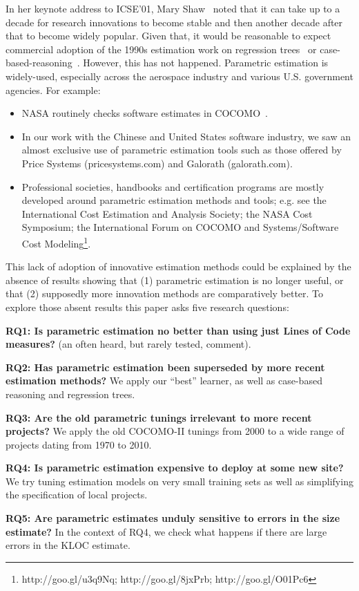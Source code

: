 \documentclass{sig-alternate}
\newcommand{\bi}{\begin{itemize}[leftmargin=0.4cm]}
\newcommand{\ei}{\end{itemize}}
\begin{document}
In her keynote address to ICSE'01, Mary Shaw~\cite{shaw01} noted that it can take up to a
decade  for  research innovations
to become stable and then another decade after that to become widely popular. Given that, it would be reasonable
to expect commercial adoption of  the 1990s estimation work
on  regression trees~\cite{shepperd97} or case-based-reasoning~\cite{shepperd97}. However, 
this has not happened.
Parametric estimation is
widely-used, especially across the aerospace
industry and various U.S. government agencies. For example:
\bi 
\item 
NASA routinely checks  software estimates 
in  COCOMO~\cite{dabney07}.  
\item
In our work with the Chinese and United States software industry,
we saw an   almost exclusive
use  of parametric estimation tools such as those offered by 
Price Systems (pricesystems.com) and  Galorath (galorath.com).
\item 
Professional societies, handbooks and
certification programs are mostly developed around 
parametric estimation methods and tools; e.g. see the 
International Cost Estimation and Analysis Society; the
NASA Cost Symposium;  the
International Forum on COCOMO and Systems/Software
Cost Modeling\footnote{http://goo.gl/u3q9Nq; http://goo.gl/8jxPrb; http://goo.gl/O01Pc6}.
\ei
This  lack of adoption of   innovative  estimation methods
could be explained by the absence of results showing that
(1) parametric estimation is no longer useful, or that
(2) supposedly more innovation methods 
are comparatively better. 
To explore those absent results this paper asks five research questions:


{\bf RQ1: Is parametric estimation no better than
   using just Lines of Code measures?} 
  (an   often heard, but rarely tested, comment).

{\bf RQ2: Has parametric estimation been superseded
 by more recent estimation methods?}  We  
 apply our ``best''
learner, as well as 
case-based reasoning and regression trees.

{\bf RQ3: Are the old parametric tunings irrelevant
  to more recent projects?}  We apply the old
COCOMO-II tunings from 2000 to a wide range of projects dating from
1970 to 2010.

{\bf RQ4: Is parametric estimation expensive to deploy  at some new site?}
We try   tuning estimation models on very small training sets 
as well as simplifying the specification of local projects.

{\bf RQ5: Are parametric estimates unduly sensitive to errors in the size estimate?}
In the context of RQ4, we check what happens
if there are large errors in the KLOC estimate.
\end{document}
